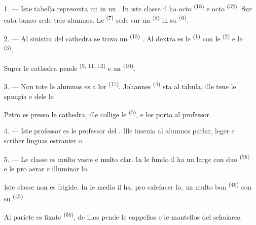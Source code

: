 \VUsaut{1.4mm}
\VUsaut{2.2mm}
\VUfilet{20mm}
\VUsaut{6.4mm}

\VUsaut{3.0mm}

1. --- Iste tabella representa un  in un . In iste
classe il ha octo  \textsuperscript{(18)} e octo 
\textsuperscript{(32)}. Sur cata banco sede tres alumnos. Le 
\textsuperscript{(7)} sede sur un  \textsuperscript{(8)} in su
 \textsuperscript{(6)}.

2. --- Al sinistra del cathedra se trova un 
\textsuperscript{(15)} . Al dextra es le 
\textsuperscript{(1)} con le  \textsuperscript{(2)} e le
 \textsuperscript{(3)}.

Super le cathedra pende  \textsuperscript{(9, 11, 12)} e
un  \textsuperscript{(10)}.

3. --- Non tote le alumnos es a lor  \textsuperscript{(17)}.
Johannes \textsuperscript{(4)} sta al tabula, ille tene le spongia e dele le
.

Petro es presso le cathedra, ille collige le 
\textsuperscript{(5)}, e los porta al professor.

4. --- Iste professor es le professor del . Ille insenia
al alumnos parlar, leger e scriber linguas estranier  o .

5. --- Le classe es multo vaste e multo clar. In le fundo il ha un large
 con duo  \textsuperscript{(78)} e le
 pro aerar e illuminar lo.

Iste classe non es frigide. In le medio il ha, pro calefacer lo, un multo bon
 \textsuperscript{(46)} con su 
\textsuperscript{(45)}.

Al pariete es fixate  \textsuperscript{(58)}, de
illos pende le cappellos e le mantellos del scholares.

\VUsaut{5.2mm}
\VUsaut{3.6mm}

